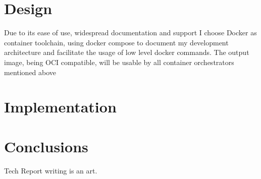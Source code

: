 \documentclass[12pt, letterpaper, twoside]{article}
\begin{document}
\section{Design}
\label{sec:design}

Due to its ease of use, widespread documentation and support I choose Docker as container toolchain, using docker compose to document my development architecture and facilitate the usage of low level docker commands. The output image, being OCI compatible, will be usable by all container orchestrators mentioned above


\section{Implementation}
\label{sec:implementation}



\section{Conclusions}
\label{sec:conc}

Tech Report writing is an art.




% 
% 

\appendix

\end{document}
